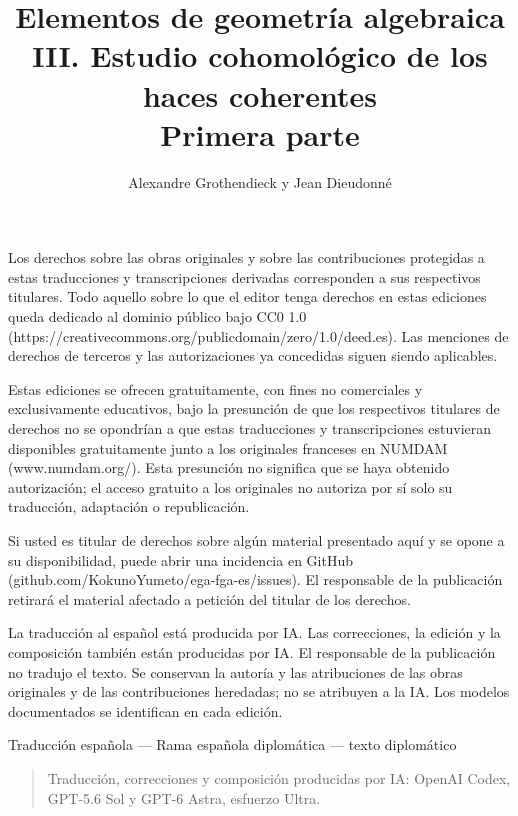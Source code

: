 Los derechos sobre las obras originales y sobre las contribuciones protegidas a estas traducciones y transcripciones derivadas corresponden a sus respectivos titulares. Todo aquello sobre lo que el editor tenga derechos en estas ediciones queda dedicado al dominio público bajo CC0 1.0 (https://creativecommons.org/publicdomain/zero/1.0/deed.es). Las menciones de derechos de terceros y las autorizaciones ya concedidas siguen siendo aplicables.

Estas ediciones se ofrecen gratuitamente, con fines no comerciales y exclusivamente educativos, bajo la presunción de que los respectivos titulares de derechos no se opondrían a que estas traducciones y transcripciones estuvieran disponibles gratuitamente junto a los originales franceses en NUMDAM (www.numdam.org/). Esta presunción no significa que se haya obtenido autorización; el acceso gratuito a los originales no autoriza por sí solo su traducción, adaptación o republicación.

Si usted es titular de derechos sobre algún material presentado aquí y se opone a su disponibilidad, puede abrir una incidencia en GitHub (github.com/KokunoYumeto/ega-fga-es/issues). El responsable de la publicación retirará el material afectado a petición del titular de los derechos.

La traducción al español está producida por IA. Las correcciones, la edición y la composición también están producidas por IA. El responsable de la publicación no tradujo el texto. Se conservan la autoría y las atribuciones de las obras originales y de las contribuciones heredadas; no se atribuyen a la IA. Los modelos documentados se identifican en cada edición.
\par
\endgroup
\clearpage


\title[EGA III-1 --- Estudio cohomológico --- Primera parte]{Elementos de geometría algebraica\\
III. Estudio cohomológico de los haces coherentes\\
Primera parte}
\author{Alexandre Grothendieck y Jean Dieudonné}
\date{}
\maketitle

\begin{center}
\large Traducción española — Rama española diplomática — texto diplomático
\end{center}

\begin{quote}\small
Traducción, correcciones y composición producidas por IA: OpenAI Codex, GPT-5.6 Sol y GPT-6 Astra, esfuerzo Ultra.
\end{quote}

